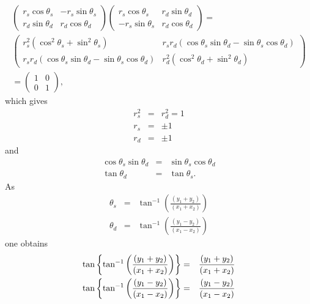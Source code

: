 \documentclass[aps,preprint]{revtex4}
\begin{document}
\begin{gather}
\left( 
\begin{array}{cc}
r_{s}\cos \theta _{s} & -r_{s}\sin \theta _{s} \\ 
r_{d}\sin \theta _{d} & r_{d}\cos \theta _{d}%
\end{array}%
\right) \left( 
\begin{array}{cc}
r_{s}\cos \theta _{s} & r_{d}\sin \theta _{d} \\ 
-r_{s}\sin \theta _{s} & r_{d}\cos \theta _{d}%
\end{array}%
\right) = \\
\left( 
\begin{array}{cc}
r_{s}^{2}\left( \cos ^{2}\theta _{s}+\sin ^{2}\theta _{s}\right) & 
r_{s}r_{d}\left( \cos \theta _{s}\sin \theta _{d}-\sin \theta _{s}\cos
\theta _{d}\right) \\ 
r_{s}r_{d}\left( \cos \theta _{s}\sin \theta _{d}-\sin \theta _{s}\cos
\theta _{d}\right) & r_{d}^{2}\left( \cos ^{2}\theta _{d}+\sin ^{2}\theta
_{d}\right)%
\end{array}%
\right) \\
=\left( 
\begin{array}{cc}
1 & 0 \\ 
0 & 1%
\end{array}%
\right) ,
\end{gather}%
which gives 
\begin{eqnarray}
r_{s}^{2} &=&r_{d}^{2}=1 \\
r_{s} &=&\pm 1 \\
r_{d} &=&\pm 1
\end{eqnarray}%
and%
\begin{eqnarray}
\cos \theta _{s}\sin \theta _{d} &=&\sin \theta _{s}\cos \theta _{d} \\
\tan \theta _{d} &=&\tan \theta _{s}.
\end{eqnarray}%
As%
\begin{eqnarray}
\theta _{s} &=&\tan ^{-1}\left( \frac{\left( y_{1}+y_{2}\right) }{\left(
x_{1}+x_{2}\right) }\right) \\
\theta _{d} &=&\tan ^{-1}\left( \frac{\left( y_{1}-y_{2}\right) }{\left(
x_{1}-x_{2}\right) }\right)
\end{eqnarray}%
one obtains 
\begin{eqnarray}
\tan \left\{ \tan ^{-1}\left( \frac{\left( y_{1}+y_{2}\right) }{\left(
x_{1}+x_{2}\right) }\right) \right\} &=&\frac{\left( y_{1}+y_{2}\right) }{%
\left( x_{1}+x_{2}\right) } \\
\tan \left\{ \tan ^{-1}\left( \frac{\left( y_{1}-y_{2}\right) }{\left(
x_{1}-x_{2}\right) }\right) \right\} &=&\frac{\left( y_{1}-y_{2}\right) }{%
\left( x_{1}-x_{2}\right) }
\end{eqnarray}%
\end{document}
